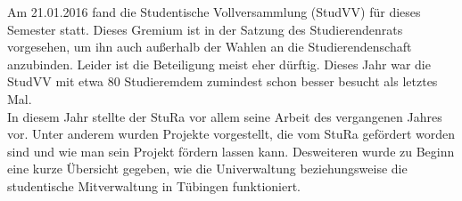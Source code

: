 Am 21.01.2016 fand die Studentische Vollversammlung (StudVV) für dieses Semester statt. Dieses Gremium ist in der Satzung des Studierendenrats vorgesehen, um ihn auch außerhalb der Wahlen an die Studierendenschaft anzubinden. Leider ist die Beteiligung meist eher dürftig. Dieses Jahr war die StudVV mit etwa 80 Studieremdem zumindest schon besser besucht als letztes Mal.\\
In diesem Jahr stellte der StuRa vor allem seine Arbeit des vergangenen Jahres vor. Unter anderem wurden Projekte vorgestellt, die vom StuRa gefördert worden sind und wie man sein Projekt fördern lassen kann. Desweiteren wurde zu Beginn eine kurze Übersicht gegeben, wie die Univerwaltung beziehungsweise die studentische Mitverwaltung in Tübingen funktioniert.
